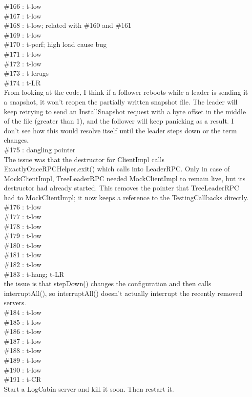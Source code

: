 \#166 : t-low\\
\#167 : t-low\\
\#168 : t-low; related with \#160 and \#161\\
\#169 : t-low\\
\#170 : t-perf; high load cause bug\\
\#171 : t-low\\
\#172 : t-low\\
\#173 : t-lcrugs\\
\#174 : t-LR\\
From looking at the code, I think if a follower reboots while a leader 
is sending it a snapshot, it won't reopen the partially written snapshot 
file. The leader will keep retrying to send an InstallSnapshot request 
with a byte offset in the middle of the file (greater than 1), and the 
follower will keep panicking as a result. I don't see how this would 
resolve itself until the leader steps down or the term changes.\\
\#175 : dangling pointer\\
The issue was that the destructor for ClientImpl calls
ExactlyOnceRPCHelper.exit() which calls into LeaderRPC. Only in case of
MockClientImpl, TreeLeaderRPC needed MockClientImpl to remain live, but
its destructor had already started. This removes the pointer that
TreeLeaderRPC had to MockClientImpl; it now keeps a reference to the
TestingCallbacks directly.
\#176 : t-low\\
\#177 : t-low\\
\#178 : t-low\\
\#179 : t-low\\
\#180 : t-low\\
\#181 : t-low\\
\#182 : t-low\\
\#183 : t-hang; t-LR\\
the issue is that stepDown() changes the configuration 
and then calls interruptAll(), so interruptAll() doesn't 
actually interrupt the recently removed servers.\\
\#184 : t-low\\
\#185 : t-low\\
\#186 : t-low\\
\#187 : t-low\\
\#188 : t-low\\
\#189 : t-low\\
\#190 : t-low\\
\#191 : t-CR\\
Start a LogCabin server and kill it soon. Then restart it. 

